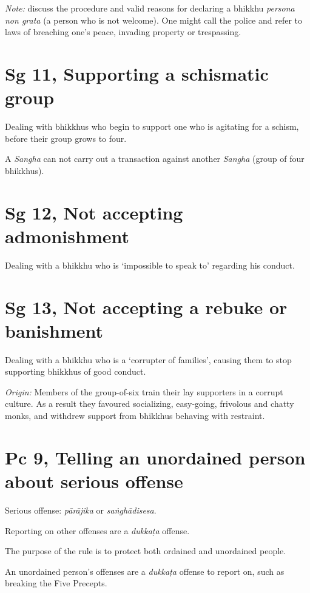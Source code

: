 \emph{Note:} discuss the procedure and valid reasons for declaring a
bhikkhu \emph{persona non grata} (a person who is not welcome). One
might call the police and refer to laws of breaching one's peace,
invading property or trespassing.

\section{Sg 11, Supporting a schismatic group}

Dealing with bhikkhus who begin to support one who is agitating for a
schism, before their group grows to four.

A \emph{Sangha} can not carry out a transaction against another
\emph{Sangha} (group of four bhikkhus).

\section{Sg 12, Not accepting admonishment}

Dealing with a bhikkhu who is `impossible to speak to' regarding his
conduct.

\section{Sg 13, Not accepting a rebuke or banishment}

Dealing with a bhikkhu who is a `corrupter of families', causing them to
stop supporting bhikkhus of good conduct.

\emph{Origin:} Members of the group-of-six train their lay supporters in
a corrupt culture. As a result they favoured socializing, easy-going,
frivolous and chatty monks, and withdrew support from bhikkhus behaving
with restraint.

\section{Pc 9, Telling an unordained person about serious offense}

Serious offense: \emph{pārājika} or \emph{saṅghādisesa}.

Reporting on other offenses are a \emph{dukkaṭa} offense.

The purpose of the rule is to protect both ordained and unordained
people.

An unordained person's offenses are a \emph{dukkaṭa} offense to report
on, such as breaking the Five Precepts.

